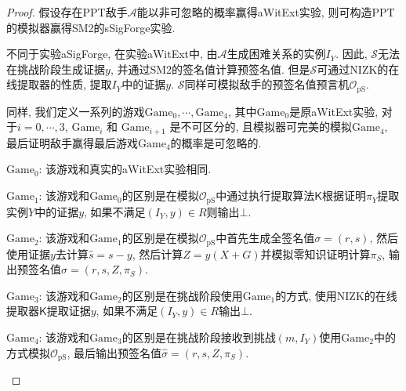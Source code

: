 \documentclass[review]{jcr}
\begin{document}
\begin{proof}

假设存在PPT敌手$\mathcal{A}$能以非可忽略的概率赢得aWitExt实验, 则可构造PPT的模拟器赢得SM2的sSigForge实验. 

不同于实验aSigForge, 在实验aWitExt中, 由$\mathcal{A}$生成困难关系的实例$I_Y$. 因此, $\mathcal{S}$无法在挑战阶段生成证据$y$, 并通过SM2的签名值计算预签名值. 但是$\mathcal{S}$可通过NIZK的在线提取器的性质, 提取$I_Y$中的证据$y$. $\mathcal{S}$同样可模拟敌手的预签名值预言机$\mathcal{O}_{\text{pS}}$. 

同样, 我们定义一系列的游戏$\text{Game}_0,\cdots,\text{Game}_4$, 其中$\text{Game}_0$是原aWitExt实验, 对于$i = 0,\cdots,3$,  $\text{Game}_i$ 和 $\text{Game}_{i+1}$ 是不可区分的, 且模拟器可完美的模拟$\text{Game}_4$, 最后证明敌手赢得最后游戏$\text{Game}_4$的概率是可忽略的. 

\begin{trivlist}
\item $\text{Game}_0$: 该游戏和真实的aWitExt实验相同. 
\end{trivlist}

\begin{trivlist}
\item $\text{Game}_1$: 该游戏和$\text{Game}_0$的区别是在模拟$\mathcal{O}_{\text{pS}}$中通过执行提取算法$\mathsf{K}$根据证明$\pi_Y$提取实例$Y$中的证据$y$, 如果不满足$(I_Y, y) \in R$则输出$\bot$. 
\end{trivlist}

\begin{trivlist}
\item $\text{Game}_2$: 该游戏和$\text{Game}_1$的区别是在模拟$\mathcal{O}_{\text{pS}}$中首先生成全签名值$\sigma=(r,s)$, 然后使用证据$y$去计算$\hat{s}=s-y$, 然后计算$Z=y(X+G)$并模拟零知识证明计算$\pi_S$, 输出预签名值$\hat{\sigma}=(r,s,Z,\pi_S)$. 
\end{trivlist}

\begin{trivlist}
\item $\text{Game}_3$: 该游戏和$\text{Game}_2$的区别是在挑战阶段使用$\text{Game}_1$的方式, 使用NIZK的在线提取器$\mathsf{K}$提取证据$y$, 如果不满足$(I_Y,y) \in R$输出$\bot$. 
\end{trivlist}

\begin{trivlist}
\item $\text{Game}_4$: 该游戏和$\text{Game}_3$的区别是在挑战阶段接收到挑战$(m, I_Y)$使用$\text{Game}_2$中的方式模拟$\mathcal{O}_{\text{pS}}$, 最后输出预签名值$\hat{\sigma}=(r,s,Z,\pi_S)$. 
\end{trivlist}


\end{proof}
\end{document}
